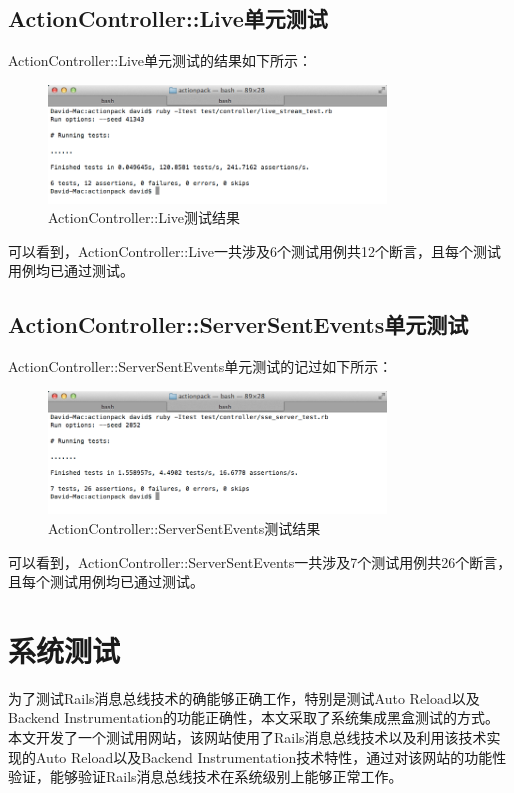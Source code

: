 \subsection{ActionController::Live单元测试}
ActionController::Live单元测试的结果如下所示：

\begin{figure}[h]
\centering
\includegraphics[width=0.8\textwidth]{images/test/live.png}
\caption{ActionController::Live测试结果}
\end{figure}
可以看到，ActionController::Live一共涉及6个测试用例共12个断言，且每个测试用例均已通过测试。

\subsection{ActionController::ServerSentEvents单元测试}
ActionController::ServerSentEvents单元测试的记过如下所示：

\begin{figure}[h]
\centering
\includegraphics[width=0.8\textwidth]{images/test/sse.png}
\caption{ActionController::ServerSentEvents测试结果}
\end{figure}
可以看到，ActionController::ServerSentEvents一共涉及7个测试用例共26个断言，且每个测试用例均已通过测试。

\section{系统测试}
为了测试Rails消息总线技术的确能够正确工作，特别是测试Auto Reload以及Backend Instrumentation的功能正确性，本文采取了系统集成黑盒测试的方式。本文开发了一个测试用网站，该网站使用了Rails消息总线技术以及利用该技术实现的Auto Reload以及Backend Instrumentation技术特性，通过对该网站的功能性验证，能够验证Rails消息总线技术在系统级别上能够正常工作。

